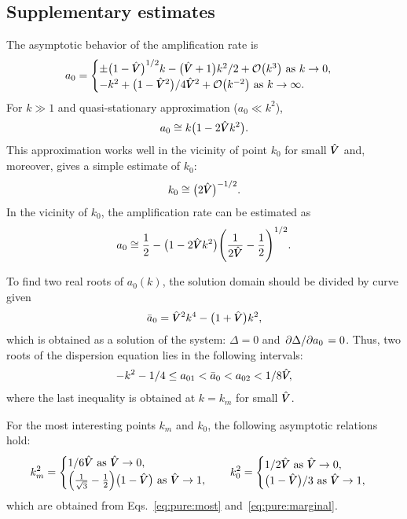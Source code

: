 \documentclass{article}
\newcommand{\hV}[1][\qty(\bar{V})]{\vphantom{#1}\mathrlap{\smash{\hat{V}}}V}
\begin{document}
\subsection{Supplementary estimates}

The asymptotic behavior of the amplification rate is
\begin{equation}\label{eq:pure:a0_asymptotics}
    a_0 = \begin{cases}
        \pm\qty(1-\hV)^{1/2}k - \qty(\hV+1)k^2/2 + \order{k^3} \text{ as } k\to0,\\
        -k^2 + \qty(1-\hV^2)/4\hV^2 + \order{k^{-2}} \text{ as } k\to\infty.
    \end{cases}
\end{equation}
For $k\gg1$ and quasi-stationary approximation ($a_0\ll k^2$),
\begin{equation}\label{eq:pure:a0_approx}
    a_0 \cong k\qty(1-2\hV k^2).
\end{equation}
This approximation works well in the vicinity of point $k_0$ for small $\hV$
and, moreover, gives a simple estimate of $k_0$:
\begin{equation}\label{eq:pure:k_0}
    k_0 \cong \qty(2\hV)^{-1/2}.
\end{equation}
In the vicinity of $k_0$, the amplification rate can be estimated as
\begin{equation}\label{eq:pure:a_0_near_k_0}
    a_0 \cong \frac12 - \qty(1-2\hV k^2)\qty(\frac1{2\hV} - \frac12)^{1/2}.
\end{equation}

To find two real roots of $a_0(k)$, the solution domain should be divided by curve given
\begin{equation}\label{eq:pure:bar_a_0}
    \bar{a}_0 = \hV^2k^4 - \qty(1+\hV)k^2,
\end{equation}
which is obtained as a solution of the system: $\Delta=0$ and $\pdv*{\Delta}{a_0}=0$.
Thus, two roots of the dispersion equation lies in the following intervals:
\begin{equation}\label{eq:pure:a_0_intervals}
    -k^2 - 1/4 \leq a_{01} < \bar{a}_0 < a_{02} < 1/8\hV,
\end{equation}
where the last inequality is obtained at $k=k_m$ for small $\hV$.

For the most interesting points $k_m$ and $k_0$, the following asymptotic relations hold:
\begin{equation}\label{eq:pure:k_asymptotics}
    k_m^2 = \begin{cases}
        1/6\hV \text{ as } \hV\to0,\\
        \qty(\frac1{\sqrt3} - \frac12)\qty(1-\hV) \text{ as } \hV\to1,
    \end{cases} \quad k_0^2 = \begin{cases}
        1/2\hV \text{ as } \hV\to0,\\
        \qty(1-\hV)/3 \text{ as } \hV\to1,
    \end{cases}
\end{equation}
which are obtained from Eqs.~\eqref{eq:pure:most} and~\eqref{eq:pure:marginal}.
\end{document}
